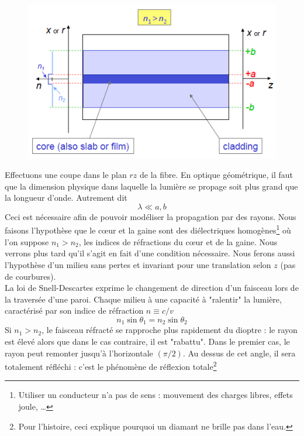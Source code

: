 	\begin{figure}
	\vspace{-9mm}
	\includegraphics[scale=0.6]{ch1/image2}
	\end{figure}
Effectuons une coupe dans le plan $rz$ de la fibre. En optique géométrique, il faut que la dimension physique dans laquelle la lumière se propage soit plus grand que la longueur d'onde. Autrement dit
\begin{equation}
\lambda \ll a,b
\end{equation}
Ceci est nécessaire afin de pouvoir modéliser la propagation par des rayons. Nous faisons l'hypothèse
que le cœur et la gaine sont des diélectriques homogènes\footnote{Utiliser un conducteur n'a pas de sens
: mouvement des charges libres, effets joule, \dots} où l'on suppose $n_1>n_2$, les indices de
réfractions du cœur et de la gaine. Nous verrons plus tard qu'il s'agit en fait d'une condition
nécessaire. Nous ferons aussi l'hypothèse d'un milieu sans pertes et invariant pour une translation
selon $z$ (pas de courbures).\\

La loi de Snell-Descartes exprime le changement de direction d'un faisceau lors de la traversée
d'une paroi. Chaque milieu à une capacité à "ralentir" la lumière, caractérisé par son indice
de réfraction $n\equiv c/v$
\begin{equation}
n_1 \sin\theta_1=n_2 \sin\theta_2
\end{equation}
Si $n_1>n_2$, le faisceau réfracté se rapproche plus rapidement du dioptre : le rayon est élevé alors
que dans le cas contraire, il est "rabattu". Dans le premier cas, le rayon peut remonter jusqu'à
l'horizontale $(\pi/2)$. Au dessus de cet angle, il sera totalement réfléchi : c'est le phénomène
de réflexion totale\footnote{Pour l'histoire, ceci explique pourquoi un diamant ne brille pas dans
l'eau.}\\


